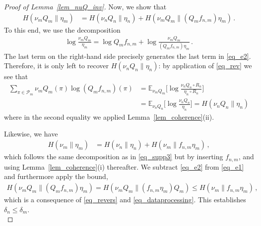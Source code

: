\documentclass[a4paper,11pt]{article}
\newcommand{\EE}{\mathbb{E}}
\newcommand{\mP}{\mathcal{P}}
\numberwithin{equation}{section}
\begin{document}
\begin{proof}[Proof of Lemma~\ref{lem_nuQ_inv}]
Now, we show that 
\begin{equation}
\begin{aligned}
H ( \nu_{m} Q_{m}\| \eta_{m})
&=
H ( \nu_{n} Q_{n}\| \eta_{n})
+
H ( \nu_{m} Q_{m}\| (Q_{m}f_{n,m} )\eta_{m})\label{eq_e2}\,.
\end{aligned}
\end{equation}
To this end, we use the decomposition
\begin{equation}\label{eq_supp3}
\begin{aligned}
	\log
\frac{\nu_{m}Q_{m}}{ \eta_{m}}= \log Q_{m}f_{n,m} + \log \frac{\nu_{m}Q_{m}}{(Q_{m}f_{n,m} )\eta_{m}}  \,.
\end{aligned}
\end{equation}
The last term on the right-hand side precisely generates the last term in \eqref{eq_e2}.
Therefore, it is only left to recover $H ( \nu_{n} Q_{n}\| \eta_{n})$: by application of \eqref{eq_rev} we see that
\begin{equation*}
\begin{aligned}
\sum_{\pi \in \mP_{m}} \nu_{m} Q_{m}( \pi ) \log{ (Q_{m}f_{n,m}) ( \pi) }  
&=
\EE_{\nu_{m}Q_{m}}\bigg[ \log{ \frac{\nu_{n}Q_{n}\circ R_{n} }{ \eta_{n}\circ R_{n} }   }\bigg]\\
&= \EE_{\nu_{n}Q_{n}}\Big[ \log{\frac{\nu_{n}Q_{n}}{\eta_{n}} }  \Big]
=H ( \nu_{n} Q_{n}\| \eta_{n})
\end{aligned}
\end{equation*}
where in the second equality we applied Lemma~\ref{lem_coherence}(ii).

Likewise, we have 
\begin{equation}
\begin{aligned}
H ( \nu_{m} \| \eta_{m})
&=
H ( \nu_{n} \| \eta_{n})
+
H ( \nu_{m}\| f_{n,m} \eta_{m})\label{eq_e1}\,,
\end{aligned}
\end{equation}
which follows the same decomposition as in \eqref{eq_supp3} but by inserting $ f_{n,m}$, and  using Lemma~\ref{lem_coherence}(i) thereafter.
We subtract \eqref{eq_e2} from \eqref{eq_e1} and furthermore apply the bound,
\begin{equation}\label{eq_e3}
\begin{aligned}
H ( \nu_{m} Q_{m}\| (Q_{m}f_{n,m} )\eta_{m})
	=
H ( \nu_{m} Q_{m} \| (f_{n,m}\eta_{m})Q_{m})
\leqslant 
H ( \nu_{m} \| f_{n,m}\eta_{m})\,,
\end{aligned}
\end{equation}
which is a consequence of \eqref{eq_revers} and \eqref{eq_dataprocessing}.
This establishes $ \delta_{n} \leqslant \delta_{m}$. \\


\end{proof}
\end{document}
